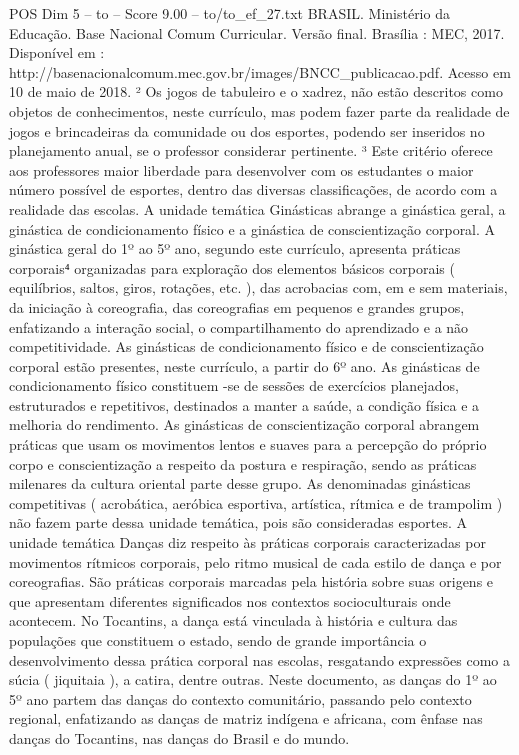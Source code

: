 \begin{textsample}{POS Dim 5 – to – Score 9.00 – to/to\_ef\_27.txt}
BRASIL.
Ministério da Educação.
Base Nacional Comum Curricular.
Versão final.
Brasília : MEC, 2017.
Disponível em : http://basenacionalcomum.mec.gov.br/images/BNCC\_publicacao.pdf.
Acesso em 10 de maio de 2018. ² Os jogos de tabuleiro e o xadrez, não estão descritos como objetos de conhecimentos, neste currículo, mas podem fazer parte da realidade de jogos e brincadeiras da comunidade ou dos esportes, podendo ser inseridos no planejamento anual, se o professor considerar pertinente. ³ Este critério oferece aos professores maior liberdade para desenvolver com os estudantes o maior número possível de esportes, dentro das diversas classificações, de acordo com a realidade das escolas.
A unidade temática Ginásticas abrange a ginástica geral, a ginástica de condicionamento físico e a ginástica de conscientização corporal.
A ginástica geral do 1º ao 5º ano, segundo este currículo, apresenta práticas corporais⁴ organizadas para exploração dos elementos básicos corporais ( equilíbrios, saltos, giros, rotações, etc. ), das acrobacias com, em e sem materiais, da iniciação à coreografia, das coreografias em pequenos e grandes grupos, enfatizando a interação social, o compartilhamento do aprendizado e a não competitividade.
As ginásticas de condicionamento físico e de conscientização corporal estão presentes, neste currículo, a partir do 6º ano.
As ginásticas de condicionamento físico constituem -se de sessões de exercícios planejados, estruturados e repetitivos, destinados a manter a saúde, a condição física e a melhoria do rendimento.
As ginásticas de conscientização corporal abrangem práticas que usam os movimentos lentos e suaves para a percepção do próprio corpo e conscientização a respeito da postura e respiração, sendo as práticas milenares da cultura oriental parte desse grupo.
As denominadas ginásticas competitivas ( acrobática, aeróbica esportiva, artística, rítmica e de trampolim ) não fazem parte dessa unidade temática, pois são consideradas esportes.
A unidade temática Danças diz respeito às práticas corporais caracterizadas por movimentos rítmicos corporais, pelo ritmo musical de cada estilo de dança e por coreografias.
São práticas corporais marcadas pela história sobre suas origens e que apresentam diferentes significados nos contextos socioculturais onde acontecem.
No Tocantins, a dança está vinculada à história e cultura das populações que constituem o estado, sendo de grande importância o desenvolvimento dessa prática corporal nas escolas, resgatando expressões como a súcia ( jiquitaia ), a catira, dentre outras.
Neste documento, as danças do 1º ao 5º ano partem das danças do contexto comunitário, passando pelo contexto regional, enfatizando as danças de matriz indígena e africana, com ênfase nas danças do Tocantins, nas danças do Brasil e do mundo.

\end{textsample}
